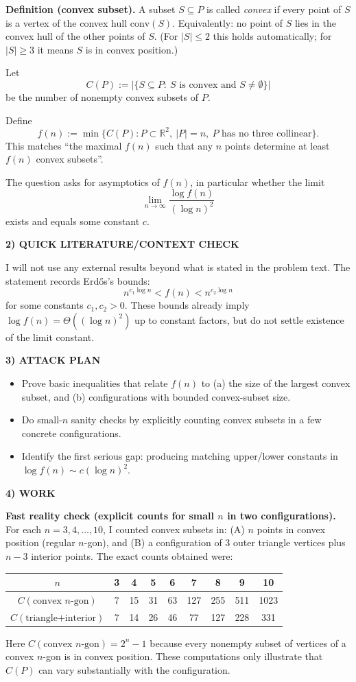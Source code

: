 \textbf{Definition (convex subset).}
A subset $S\subseteq P$ is called \emph{convex} if every point of $S$ is a vertex of the convex hull $\mathrm{conv}(S)$.
Equivalently: no point of $S$ lies in the convex hull of the other points of $S$.
(For $|S|\le 2$ this holds automatically; for $|S|\ge 3$ it means $S$ is in convex position.)

Let
\[
C(P):=\big|\{S\subseteq P:\ S\text{ is convex and }S\neq\emptyset\}\big|
\]
be the number of nonempty convex subsets of $P$.

Define
\[
f(n):=\min\{C(P): P\subset\mathbb R^2,\ |P|=n,\ P\text{ has no three collinear}\}.
\]
This matches ``the maximal $f(n)$ such that any $n$ points determine at least $f(n)$ convex subsets''.

The question asks for asymptotics of $f(n)$, in particular whether the limit
\[
\lim_{n\to\infty}\frac{\log f(n)}{(\log n)^2}
\]
exists and equals some constant $c$.

\medskip
\noindent\textbf{2) QUICK LITERATURE/CONTEXT CHECK}

I will not use any external results beyond what is stated in the problem text.
The statement records Erd\H{o}s's bounds:
\[
n^{c_1\log n}<f(n)< n^{c_2\log n}
\]
for some constants $c_1,c_2>0$.
These bounds already imply $\log f(n)=\Theta((\log n)^2)$ up to constant factors, but do not settle existence of the limit constant.

\medskip
\noindent\textbf{3) ATTACK PLAN}

\begin{itemize}
\item Prove basic inequalities that relate $f(n)$ to (a) the size of the largest convex subset, and (b) configurations with bounded convex-subset size.
\item Do small-$n$ sanity checks by explicitly counting convex subsets in a few concrete configurations.
\item Identify the first serious gap: producing matching upper/lower constants in $\log f(n)\sim c(\log n)^2$.
\end{itemize}

\medskip
\noindent\textbf{4) WORK}

\textbf{Fast reality check (explicit counts for small $n$ in two configurations).}
For each $n=3,4,\dots,10$, I counted convex subsets in:
(A) $n$ points in convex position (regular $n$-gon), and
(B) a configuration of 3 outer triangle vertices plus $n-3$ interior points.
The exact counts obtained were:
\begin{center}
\begin{tabular}{c|cccccccc}
$n$ & 3&4&5&6&7&8&9&10\\\hline
$C(\text{convex }n\text{-gon})$ &7&15&31&63&127&255&511&1023\\
$C(\text{triangle+interior})$ &7&14&26&46&77&127&228&331
\end{tabular}
\end{center}
Here $C(\text{convex }n\text{-gon})=2^n-1$ because every nonempty subset of vertices of a convex $n$-gon is in convex position.
These computations only illustrate that $C(P)$ can vary substantially with the configuration.

